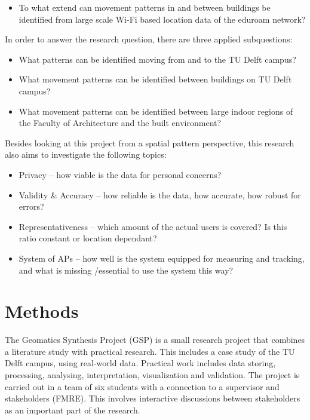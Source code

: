 \begin{itemize}
\item To what extend can movement patterns in and between buildings be identified from large scale Wi-Fi based location data of the eduroam network?
\end{itemize}
In order to answer the research question, there are three applied subquestions:
\begin{itemize}
\item What patterns can be identified moving from and to the TU Delft campus?
\item What movement patterns can be identified between buildings on TU Delft campus?
\item What movement patterns can be identified between large indoor regions of the Faculty of Architecture and the built environment?
\end{itemize}
Besides looking at this project from a spatial pattern perspective, this research also aims to investigate the following topics:
\begin{itemize}
\item Privacy – how viable is the data for personal concerns?
\item Validity \& Accuracy – how reliable is the data, how accurate, how robust for errors?
\item Representativeness – which amount of the actual users is covered? Is this ratio constant or
location dependant? 
\item System of APs – how well is the system equipped for measuring and tracking, and what is missing /essential to use the system this way?
\end{itemize}

\section{Methods}\label{methods}
The Geomatics Synthesis Project (GSP) is a small research project that combines a literature study with practical research. This includes a case study of the TU Delft campus, using real-world data. Practical work includes data storing, processing, analysing, interpretation, visualization and validation. The project is carried out in a team of six students with a connection to a supervisor and stakeholders (FMRE). This involves interactive discussions between stakeholders as an important part of the research.

